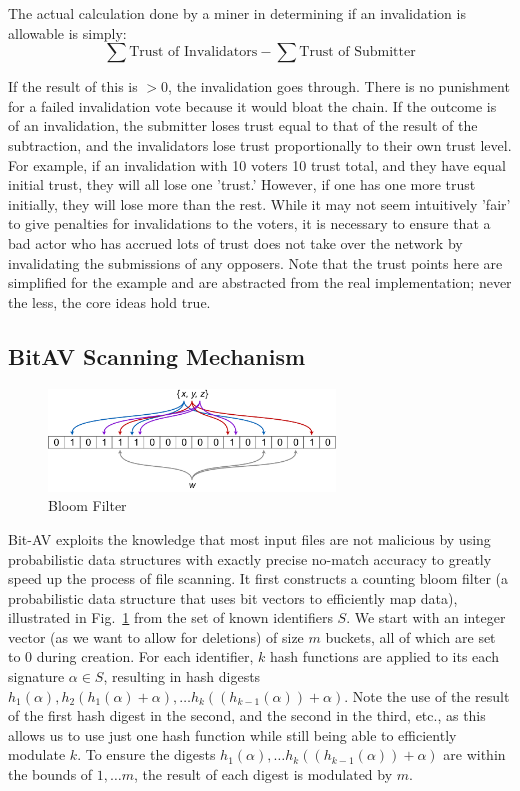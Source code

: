 \documentclass[12pt,journal]{IEEEtran}
\begin{document}
The actual calculation done by a miner in determining if an invalidation is allowable is simply:
\begin{equation}
\sum \text{Trust of Invalidators} - \sum \text{Trust of Submitter}
\end{equation}

If the result of this is $> 0$, the invalidation goes through. There is no punishment for a failed invalidation vote because it would bloat the chain. If the outcome is of an invalidation, the submitter loses trust equal to that of the result of the subtraction, and the invalidators lose trust proportionally to their own trust level. For example, if an invalidation with 10 voters 10 trust total, and they have equal initial trust, they will all lose one 'trust.' However, if one has one more trust initially, they will lose more than the rest. While it may not seem intuitively 'fair' to give penalties for invalidations to the voters, it is necessary to ensure that a bad actor who has accrued lots of trust does not take over the network by invalidating the submissions of any opposers. Note that the trust points here are simplified for the example and are abstracted from the real implementation; never the less, the core ideas hold true. 


\subsection{BitAV Scanning Mechanism}
\begin{figure}[!t]
\centering
\includegraphics[width=3in]{figures/vector/bf}
\caption{Bloom Filter\cite{Eppstein2007}}
\label{fig_bf}
\end{figure}
Bit-AV exploits the knowledge that most input files are not malicious by using probabilistic data structures with exactly precise no-match accuracy to greatly speed up the process of file scanning. It first constructs a counting bloom filter\cite{Bloom1970} (a probabilistic data structure that uses bit vectors to efficiently map data\cite{Karpilovsky2005}), illustrated in Fig.~\ref{fig_bf} from the set of known identifiers $S$. We start with an integer vector (as we want to allow for deletions\cite{bonomi2006improved}) of size $m$ buckets, all of which are set to $0$ during creation. For each identifier, $k$ hash functions are applied to its each signature $\alpha \in S$, resulting in hash digests $h_1(\alpha), h_2(h_1(\alpha) + \alpha), \dots h_k((h_{k-1}(\alpha)) + \alpha)$. Note the use of the result of the first hash digest in the second, and the second in the third, etc., as this allows us to use just one hash function while still being able to efficiently modulate $k$. To ensure the digests $h_1(\alpha), \dots h_k((h_{k-1}(\alpha)) + \alpha)$ are within the bounds of $1, \dots m$, the result of each digest is modulated by $m$.\par
\end{document}
